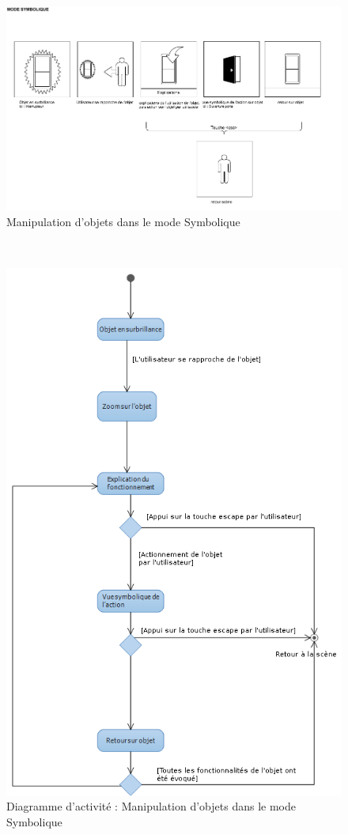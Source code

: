 \begin{figure}[h]
\centering
\includegraphics[width=1\textwidth]{img-utilisateur/symbolique.png}
\caption{\label{fig:MaquetteSymbolique} Manipulation d'objets dans le mode Symbolique }
\end{figure}
\\
\begin{figure}[h]
\centering
\includegraphics[width=1\textwidth]{img-utilisateur/activite-symbolique.png}
\caption{\label{fig:CasUsageSymbolique} Diagramme d'activité : Manipulation d'objets dans le mode Symbolique }
\end{figure}
\FloatBarrier 



